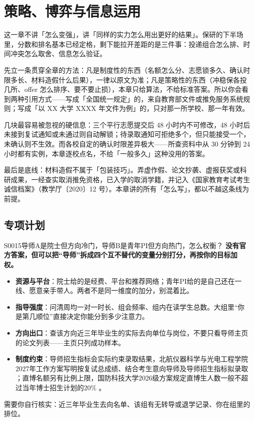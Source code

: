 \chapter{策略、博弈与信息运用}
\label{ch17}
\begin{keybox}
这一章不讲「怎么变强」，讲「同样的实力怎么用出更好的结果」。保研的下半场里，分数和排名基本已经定格，剩下能拉开差距的是三件事：投递组合怎么排、时间冲突怎么取舍、信息怎么验证。

先立一条贯穿全章的方法：凡是制度性的东西（名额怎么分、志愿锁多久、确认时限多长、材料造假什么后果），一律以原文为准；凡是策略性的东西（冲稳保各投几所、offer 怎么排序、要不要止损），本章只给算法，不给标准答案。所以你会看到两种引用方式——写成「全国统一规定」的，来自教育部文件或推免服务系统规则；写成「以 XX 大学 XXXX 年文件为例」的，只对那一所学校、那一年有效。

几块最容易被忽视的硬信息：三个平行志愿提交后 48 小时内不可修改，48 小时后未接到复试通知或未通过则自动解锁；待录取通知可拒绝多个，但只能接受一个，未确认则不生效。而各校自定的确认时限差异极大——所查资料中从 30 分钟到 24 小时都有实例，本章逐校点名，不给「一般多久」这种没用的答案。

最后是底线：材料造假不属于「包装技巧」。弄虚作假、论文抄袭、虚报获奖或科研成果，一经查实取消推免资格，已入学的取消学籍，并记入《国家教育考试考生诚信档案》（教学厅〔2020〕12 号）。本章讲的所有「怎么写」，都以不越这条线为前提。
\end{keybox}

\section{专项计划}
\begin{qa}{S0015}{导师A是院士但方向冷门，导师B是青年PI但方向热门，怎么权衡？}
\textbf{没有官方答案，但可以把“导师”拆成四个互不替代的变量分别打分，再按你的目标加权。}

\begin{itemize}
  \item \textbf{资源与平台}：院士给的是经费、平台和推荐网络；青年PI给的是自己还在一线、愿意亲手带人。两者不是同一维度的加分，别混着比。
  \item \textbf{指导强度}：问清周均一对一时长、组会频率、组内在读学生总数。大组里“你是第几顺位”直接决定你能分到多少注意力。
  \item \textbf{方向出口}：查该方向近三年毕业生的实际去向单位与岗位，不要只看导师主页的论文列表——主页只列成功样本。
  \item \textbf{制度约束}：导师招生指标会实际约束录取结果，北航仪器科学与光电工程学院2027年工作方案写明按复试总成绩、结合考生意向导师及导师招生指标拟录取 ；直博名额另有比例上限，国防科技大学2026级方案规定直博生人数一般不超过当年博士招生计划的20\% 。
\end{itemize}

需要你自行核实：近三年毕业生去向名单、该组有无转导或退学记录、你在组里的排位。
\end{qa}

